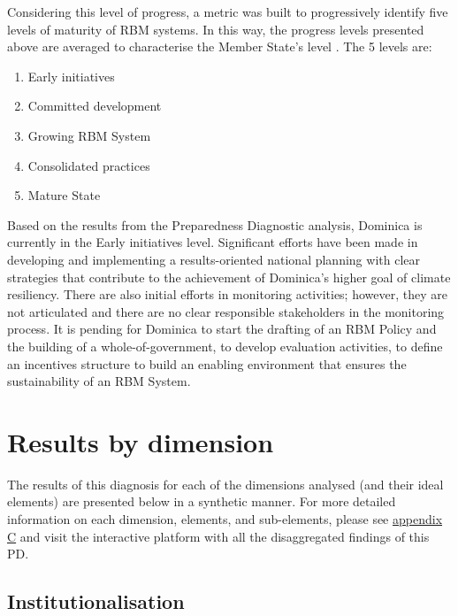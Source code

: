 \documentclass[
  10pt,
]{book}
\providecommand{\tightlist}{%
  \setlength{\itemsep}{0pt}\setlength{\parskip}{0pt}}
\begin{document}
Considering this level of progress, a metric was built to progressively identify five levels of maturity of RBM systems. In this way, the progress levels presented above are averaged to characterise the Member State's level . The 5 levels are:

\begin{enumerate}
\def\labelenumi{\arabic{enumi}.}
\tightlist
\item
  Early initiatives
\item
  Committed development
\item
  Growing RBM System
\item
  Consolidated practices
\item
  Mature State
\end{enumerate}

Based on the results from the Preparedness Diagnostic analysis, Dominica is currently in the Early initiatives level. Significant efforts have been made in developing and implementing a results-oriented national planning with clear strategies that contribute to the achievement of Dominica's higher goal of climate resiliency. There are also initial efforts in monitoring activities; however, they are not articulated and there are no clear responsible stakeholders in the monitoring process. It is pending for Dominica to start the drafting of an RBM Policy and the building of a whole-of-government, to develop evaluation activities, to define an incentives structure to build an enabling environment that ensures the sustainability of an RBM System.

\hypertarget{results-by-dimension}{%
\section{Results by dimension}\label{results-by-dimension}}

The results of this diagnosis for each of the dimensions analysed (and their ideal elements) are presented below in a synthetic manner. For more detailed information on each dimension, elements, and sub-elements, please see \protect\hyperlink{appendixC}{appendix C} and visit the interactive platform with all the disaggregated findings of this PD.

\hypertarget{institutionalisation}{%
\subsection{Institutionalisation}\label{institutionalisation}}
\end{document}

